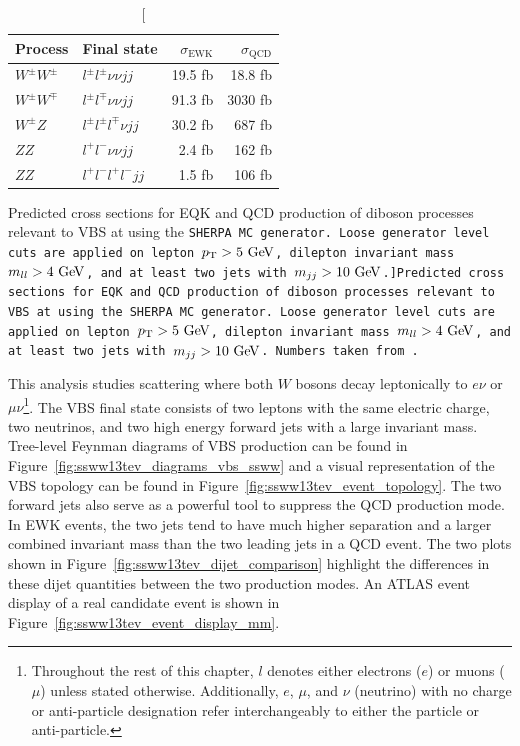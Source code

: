 
\begin{table}[htbp]
  \centering
  \begin{tabular}{l l r r}
    Process & Final state & $\sigma_{\textrm{EWK}}$ & $\sigma_{\textrm{QCD}}$ \\
    \hline\hline
    $W^{\pm}W^{\pm}$ & $l^{\pm}l^{\pm}\nu\nu jj$    & 19.5 fb & 18.8 fb \\
    $W^{\pm}W^{\mp}$ & $l^{\pm}l^{\mp}\nu\nu jj$    & 91.3 fb & 3030 fb \\
    $W^{\pm}Z$      & $l^{\pm}l^{\pm}l^{\mp}\nu jj$ & 30.2 fb & 687 fb  \\
    $ZZ$          & $l^{+}l^{-}\nu\nu jj$        & 2.4 fb  & 162 fb  \\
    $ZZ$          & $l^{+}l^{-}l^{+}l^{-} jj$     & 1.5 fb  & 106 fb \\
    \hline
  \end{tabular}
  \caption[Predicted cross sections for EQK and QCD production of diboson processes relevant to VBS at  using the \tt{SHERPA} MC generator.  Loose generator level cuts are applied on lepton $\pt > 5\gev$, dilepton invariant mass $m_{ll} > 4\gev$, and at least two jets with $m_{jj} > 10\gev$.]{Predicted cross sections for EQK and QCD production of diboson processes relevant to VBS at  using the \tt{SHERPA} MC generator.  Loose generator level cuts are applied on lepton $\pt > 5\gev$, dilepton invariant mass $m_{ll} > 4\gev$, and at least two jets with $m_{jj} > 10\gev$.  Numbers taken from~\cite{2013.ssww-8tev-atlas-support}.}
  \label{tab:ssww13tev_qcd_vs_ewk}
\end{table}

This analysis studies \ssww scattering where both $W$ bosons decay leptonically to $e\nu$ or $\mu\nu$\footnote{Throughout the rest of this chapter, $l$ denotes either electrons ($e$) or muons ($\mu$) unless stated otherwise.  Additionally, $e$, $\mu$, and $\nu$ (neutrino) with no charge or anti-particle designation refer interchangeably to either the particle or anti-particle.}.
The \ssww VBS final state consists of two leptons with the same electric charge, two neutrinos, and two high energy forward jets with a large invariant mass.
Tree-level Feynman diagrams of VBS \ssww production can be found in Figure~\ref{fig:ssww13tev_diagrams_vbs_ssww} and a visual representation of the VBS topology can be found in Figure~\ref{fig:ssww13tev_event_topology}.
The two forward jets also serve as a powerful tool to suppress the QCD production mode.
In EWK events, the two jets tend to have much higher separation and a larger combined invariant mass than the two leading jets in a QCD event.
The two plots shown in Figure~\ref{fig:ssww13tev_dijet_comparison} highlight the differences in these dijet quantities between the two production modes.
An ATLAS event display of a real \ssww candidate event is shown in Figure~\ref{fig:ssww13tev_event_display_mm}.

